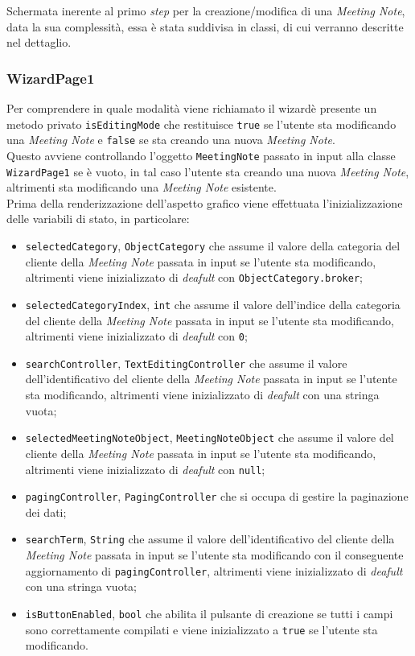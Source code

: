 Schermata inerente al primo \emph{step} per la creazione/modifica di una \emph{Meeting Note}, data la sua complessità, essa è stata suddivisa in classi, di cui verranno descritte nel dettaglio. 

\subsubsection*{WizardPage1}
\label{subsubsec:wizard-page-1}

Per comprendere in quale modalità viene richiamato il \gls{wizard}\glsoccur è presente un metodo privato \lstinline{isEditingMode} che restituisce \lstinline{true} se l'utente sta modificando una \emph{Meeting Note} e \lstinline{false} se sta creando una nuova \emph{Meeting Note}. \\
Questo avviene controllando l'oggetto \lstinline{MeetingNote} passato in input alla classe \lstinline{WizardPage1} se è vuoto, in tal caso l'utente sta creando una nuova \emph{Meeting Note}, altrimenti sta modificando una \emph{Meeting Note} esistente. \\
Prima della renderizzazione dell'aspetto grafico viene effettuata l'inizializzazione delle variabili di stato, in particolare:
\begin{itemize}
    \item \lstinline{selectedCategory}, \lstinline{ObjectCategory} che assume il valore della categoria del cliente della \emph{Meeting Note} passata in input se l'utente sta modificando, altrimenti viene inizializzato di \emph{deafult} con \lstinline{ObjectCategory.broker};
    \item \lstinline{selectedCategoryIndex}, \lstinline{int} che assume il valore dell'indice della categoria del cliente della \emph{Meeting Note} passata in input se l'utente sta modificando, altrimenti viene inizializzato di \emph{deafult} con \lstinline{0};
    \item \lstinline{searchController}, \lstinline{TextEditingController} che assume il valore dell'identificativo del cliente della \emph{Meeting Note} passata in input se l'utente sta modificando, altrimenti viene inizializzato di \emph{deafult} con una stringa vuota;
    \item \lstinline{selectedMeetingNoteObject}, \lstinline{MeetingNoteObject} che assume il valore del cliente della \emph{Meeting Note} passata in input se l'utente sta modificando, altrimenti viene inizializzato di \emph{deafult} con \lstinline{null};
    \item \lstinline{pagingController}, \lstinline{PagingController} che si occupa di gestire la paginazione dei dati;
    \item \lstinline{searchTerm}, \lstinline{String} che assume il valore dell'identificativo del cliente della \emph{Meeting Note} passata in input se l'utente sta modificando con il conseguente aggiornamento di \lstinline{pagingController}, altrimenti viene inizializzato di \emph{deafult} con una stringa vuota;
    \item \lstinline{isButtonEnabled}, \lstinline{bool} che abilita il pulsante di creazione se tutti i campi sono correttamente compilati e viene inizializzato a \lstinline{true} se l'utente sta modificando.
\end{itemize}
